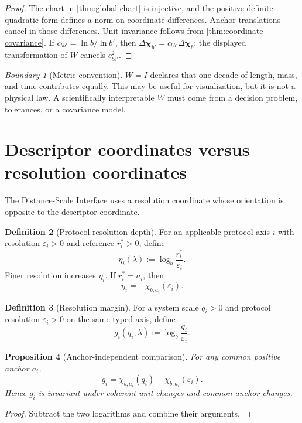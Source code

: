 \documentclass[11pt,a4paper]{article}
\theoremstyle{definition}
\newtheorem{definition}{Definition}[section]
\theoremstyle{plain}
\newtheorem{proposition}[definition]{Proposition}
\theoremstyle{remark}
\newtheorem{warning}[definition]{Boundary}
\begin{document}
\begin{proof}
The chart in \cref{thm:global-chart} is injective, and the
positive-definite quadratic form defines a norm on coordinate
differences. Anchor translations cancel in those differences. Unit
invariance follows from \cref{thm:coordinate-covariance}. If
$c_{bb'}=\ln b/\ln b'$, then $\Delta\bm\chi_{b'}=c_{bb'}\Delta\bm\chi_b$;
the displayed transformation of $W$ cancels $c_{bb'}^2$.
\end{proof}

\begin{warning}[Metric convention]
$W=I$ declares that one decade of length, mass, and time contributes
equally. This may be useful for visualization, but it is not a physical
law. A scientifically interpretable $W$ must come from a decision
problem, tolerances, or a covariance model.
\end{warning}

\section{Descriptor coordinates versus resolution coordinates}

The Distance-Scale Interface uses a resolution coordinate whose
orientation is opposite to the descriptor coordinate.

\begin{definition}[Protocol resolution depth]
For an applicable protocol axis $i$ with resolution
$\varepsilon_i>0$ and reference $r_i^*>0$, define
\[
 \eta_i(\lambda)
 :=
 \log_b\frac{r_i^*}{\varepsilon_i}.
\]
Finer resolution increases $\eta_i$. If $r_i^*=a_i$, then
\[
 \eta_i=-\chi_{b,a_i}(\varepsilon_i).
\]
\end{definition}

\begin{definition}[Resolution margin]
For a system scale $q_i>0$ and protocol resolution
$\varepsilon_i>0$ on the same typed axis, define
\[
 g_i(q_i,\lambda)
 :=
 \log_b\frac{q_i}{\varepsilon_i}.
\]
\end{definition}

\begin{proposition}[Anchor-independent comparison]
\label{prop:margin}
For any common positive anchor $a_i$,
\[
g_i
=
\chi_{b,a_i}(q_i)-\chi_{b,a_i}(\varepsilon_i).
\]
Hence $g_i$ is invariant under coherent unit changes and common anchor
changes.
\end{proposition}

\begin{proof}
Subtract the two logarithms and combine their arguments.
\end{proof}
\end{document}
